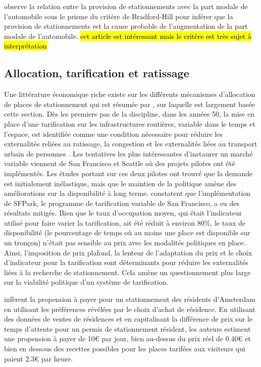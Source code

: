     \textcite{mccahill_effects_2016} observe la relation entre la provision de stationnements avec la part modale de l'automobile sous le prisme du critère de Bradford-Hill pour inférer que la provision de stationnements est la cause probable de l'augmentation de la part modale de l'automobile. \hl{cet article est intéressant mais le critère est très sujet à interprétation}

  
  \subsection{Allocation, tarification et ratissage}
    Une littérature économique riche existe sur les différents mécanismes d'allocation de places de stationnement qui est résumée par \textcite{inci_review_2015}, sur laquelle est largement basée cette section. Dès les premiers pas de la discipline, dans les années 50, la mise en place d'une tarification sur les infrastructures routières, variable dans le temps et l'espace, est identifiée comme une condition nécessaire pour réduire les externalités reliées au ratissage, la congestion et les externalités liées au transport urbain de personnes \parencite{vickrey_statement_1994}. Les tentatives les plus intéressantes d'instaurer un marché variable viennent de San Francisco et Seattle où des projets pilotes ont été implémentés. Les études portant sur ces deux pilotes ont trouvé que la demande est initialement inélastique, mais que le maintien de la politique amène des améliorations sur la disponibilité à long terme. \textcite{chatman_theory_2014} constatent que l'implémentation de SFPark, le programme de tarification variable de San Francisco, a eu des résultats mitigés. Bien que le taux d'occupation moyen, qui était l'indicateur utilisé pour faire varier la tarification,  ait été réduit à environ 80\%, le taux de disponibilité (le pourcentage de temps où au moins une place est disponible sur un tronçon) n'était pas sensible au prix avec les modalités politiques en place. Ainsi, l'imposition de prix plafond, la lenteur de l'adaptation du prix et le choix d'indicateur pour la tarification sont déterminants pour réduire les externalités liées à la recherche de stationnement. Cela amène un questionnement plus large sur la viabilité politique d'un système de tarification.\par
    \textcite{van_ommeren_real_2011} infèrent la propension à payer pour un stationnement des résidents d'Amsterdam en utilisant les préférences révélées par le choix d'achat de résidence. En utilisant des données de ventes de résidences et en capitalisant la différence de prix sur le temps d'attente pour un permis de stationnement résident, les auteurs estiment une propension à payer de 10€ par jour, bien au-dessus du prix réel de 0.40€ et bien en dessous des recettes possibles pour les places tarifées aux visiteurs qui paient 2.3€ par heure.\par

